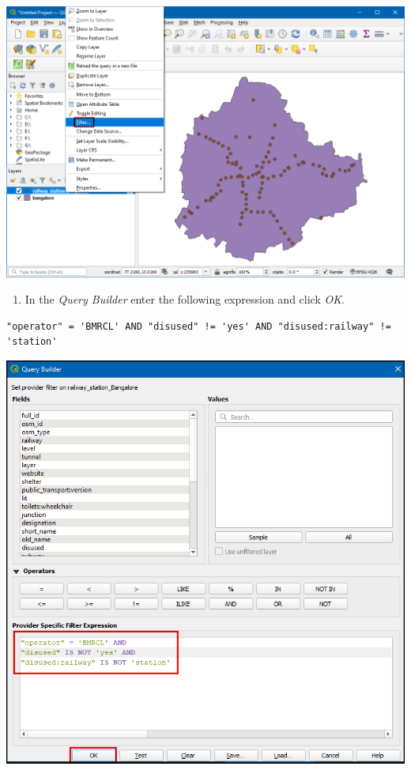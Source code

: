 \documentclass[
  12pt,
  a4paper]{article}
\providecommand{\tightlist}{%
  \setlength{\itemsep}{0pt}\setlength{\parskip}{0pt}}
\begin{document}
\begin{center}\includegraphics[width=0.75\linewidth]{images/spatial_data_viz/pop3} \end{center}

\begin{enumerate}
\def\labelenumi{\arabic{enumi}.}
\setcounter{enumi}{3}
\tightlist
\item
  In the \emph{Query Builder} enter the following expression and click
  \emph{OK}.
\end{enumerate}

\begin{verbatim}
"operator" = 'BMRCL' AND "disused" != 'yes' AND "disused:railway" != 'station'
\end{verbatim}

\begin{center}\includegraphics[width=0.75\linewidth]{images/spatial_data_viz/pop4} \end{center}
\end{document}
